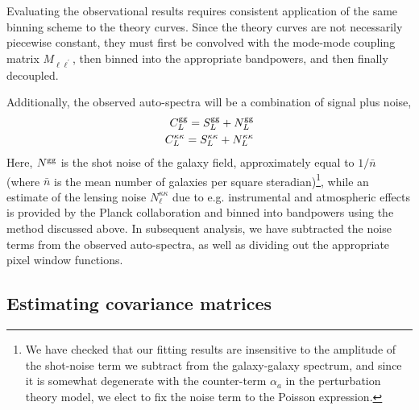 \documentclass[a4paper,usenatbib]{mnras}
\begin{document}
Evaluating the observational results requires consistent application of the same binning scheme to the theory curves. Since the theory curves are not necessarily piecewise constant, they must first be convolved with the mode-mode coupling matrix $M_{\ell\ell^{\prime}}$, then binned into the appropriate bandpowers, and then finally decoupled.

Additionally, the observed auto-spectra will be a combination of signal plus noise,
\begin{align}
    C_{L}^{\rm gg} = S_{L}^{\rm gg} + N_{L}^{\rm gg} \\
    C_{L}^{\kappa \kappa} = S_{L}^{\kappa \kappa} + N_{L}^{\kappa \kappa}
\end{align}
Here, $N^{\rm gg}$ is the shot noise of the galaxy field, approximately equal to $1/\bar{n}$ (where $\bar{n}$ is the mean number of galaxies per square steradian)\footnote{We have checked that our fitting results are insensitive to the amplitude of the shot-noise term we subtract from the galaxy-galaxy spectrum, and since it is somewhat degenerate with the counter-term $\alpha_{a}$ in the perturbation theory model, we elect to fix the noise term to the Poisson expression.}, while an estimate of the lensing noise $N^{\kappa \kappa}_{\ell}$ due to e.g. instrumental and atmospheric effects is provided by the Planck collaboration and binned into bandpowers using the method discussed above. In subsequent analysis, we have subtracted the noise terms from the observed auto-spectra, as well as dividing out the appropriate pixel window functions.

\subsection{Estimating covariance matrices}
\end{document}
